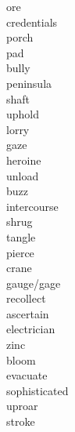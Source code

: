 \documentclass[a4paper, 11pt]{ctexart}
\begin{document}
\begin{multicols*}{3}
\begin{description}
\item[ore]

\item[credentials]

\item[porch]

\item[pad]

\item[bully]

\item[peninsula]

\item[shaft]

\item[uphold]

\item[lorry]

\item[gaze]

\item[heroine]

\item[unload]

\item[buzz]

\item[intercourse]

\item[shrug]

\item[tangle]

\item[pierce]

\item[crane]

\item[gauge/gage]

\item[recollect]

\item[ascertain]

\item[electrician]

\item[zinc]

\item[bloom]

\item[evacuate]

\item[sophisticated]

\item[uproar]

\item[stroke]


\end{description}
\end{multicols*}
\end{document}
